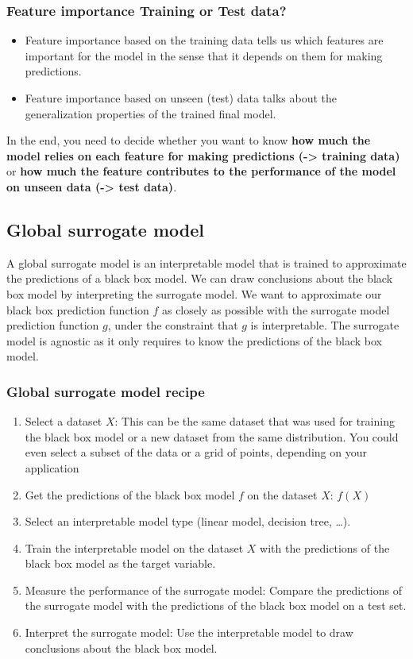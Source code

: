 \subsubsection{Feature importance \- Training or Test data?}
\begin{itemize}
    \item Feature importance based on the training data tells us which features are important for the model in the sense that it depends on them for making predictions.
    \item Feature importance based on unseen (test) data talks about the generalization properties of the trained final model.
\end{itemize}

In the end, you need to decide whether you want to know \textbf{how much the model relies on each feature for making predictions (-> training data)} or \textbf{how much the feature contributes to the performance of the model on unseen data (-> test data)}.

\subsection{Global surrogate model}
A global surrogate model is an interpretable model that is trained to approximate the predictions of a black box model. We can draw conclusions about the black box model by interpreting the surrogate model.
We want to approximate our black box prediction function $f$ as closely as possible with the surrogate model prediction function $g$, under the constraint that $g$ is interpretable.
The surrogate model is agnostic as it only requires to know the predictions of the black box model.

\subsubsection{Global surrogate model recipe}
\begin{enumerate}
    \item Select a dataset $X$: This can be the same dataset that was used for training the black box model or a new dataset from
    the same distribution. You could even select a subset of the data or a grid of points, depending on
    your application
    \item Get the predictions of the black box model $f$ on the dataset $X$: $f(X)$
    \item Select an interpretable model type (linear model, decision tree, …).
    \item Train the interpretable model on the dataset $X$ with the predictions of the black box model as the target variable.
    \item Measure the performance of the surrogate model: Compare the predictions of the surrogate model with the predictions of the black box model on a test set.
    \item Interpret the surrogate model: Use the interpretable model to draw conclusions about the black box model.
\end{enumerate}

